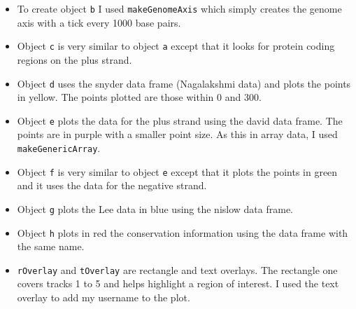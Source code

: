 \documentclass[letterpaper,12pt]{article}
\newcommand{\pl}[1]{\texttt{#1}}
\begin{document}
\begin{enumerate}
\begin{itemize}
  \item To create object \pl{b} I used \pl{makeGenomeAxis} which simply creates the genome axis with a tick every 1000 base pairs.
  \item Object \pl{c} is very similar to object \pl{a} except that it looks for protein coding regions on the plus strand.
  \item Object \pl{d} uses the snyder data frame (Nagalakshmi data) and plots the points in yellow. The points plotted are those within 0 and 300.
  \item Object \pl{e} plots the data for the plus strand using the david data frame. The points are in purple with a smaller point size. As this in array data, I used \pl{makeGenericArray}.
  \item Object \pl{f} is very similar to object \pl{e} except that it plots the points in green and it uses the data for the negative strand.
  \item Object \pl{g} plots the Lee data in blue using the nislow data frame.
  \item Object \pl{h} plots in red the conservation information using the data frame with the same name.
  \item \pl{rOverlay} and \pl{tOverlay} are rectangle and text overlays. The rectangle one covers tracks 1 to 5 and helps highlight a region of interest. I used the text overlay to add my username to the plot.
  \end{itemize}
  \end{enumerate}
\end{document}
